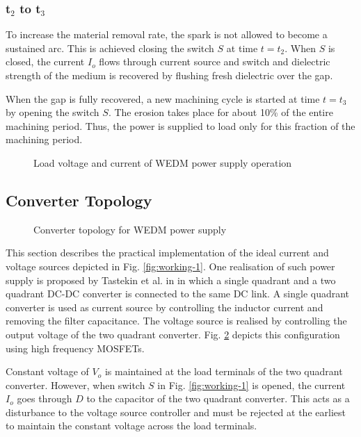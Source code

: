 \documentclass[a4paper]{IEEEtran}
\begin{document}
\subsubsection{\textbf{t$_2$ to t$_3$}}
	To increase the material removal rate, the spark is not allowed to become a sustained arc. This is achieved closing the switch $S$ at time $t=t_2$. When $S$ is closed, the current $I_o$ flows through current source and switch and dielectric strength of the medium is recovered by flushing fresh dielectric over the gap.

	When the gap is fully recovered, a new machining cycle is started at time $t=t_3$ by opening the switch $S$. The erosion takes place for about 10\% of the entire machining period. Thus, the power is supplied to load only for this fraction of the machining period.

	\begin{figure}
		\centering
		
		\caption{Load voltage and current of WEDM power supply operation}
		\label{fig:working-2}
	\end{figure}

\subsection{Converter Topology}

	\begin{figure}
		\centering
		
		\caption{Converter topology for WEDM power supply}
		\label{fig:working-3}
	\end{figure}

	This section describes the practical implementation of the ideal current and voltage sources depicted in Fig. \ref{fig:working-1}. One realisation of such power supply is proposed by Tastekin et al. in \cite{tastekin2009novel} in which a single quadrant and a two quadrant DC-DC converter is connected to the same DC link. A single quadrant converter is used as current source by controlling the inductor current and removing the filter capacitance. The voltage source is realised by controlling the output voltage of the two quadrant converter. Fig. \ref{fig:working-3} depicts this configuration using high frequency MOSFETs.

	Constant voltage of $V_o$ is maintained at the load terminals of the two quadrant converter. However, when switch $S$ in Fig. \ref{fig:working-1} is opened, the current $I_o$ goes through $D$ to the capacitor of the two quadrant converter. This acts as a disturbance to the voltage source controller and must be rejected at the earliest to maintain the constant voltage across the load terminals.
\end{document}
